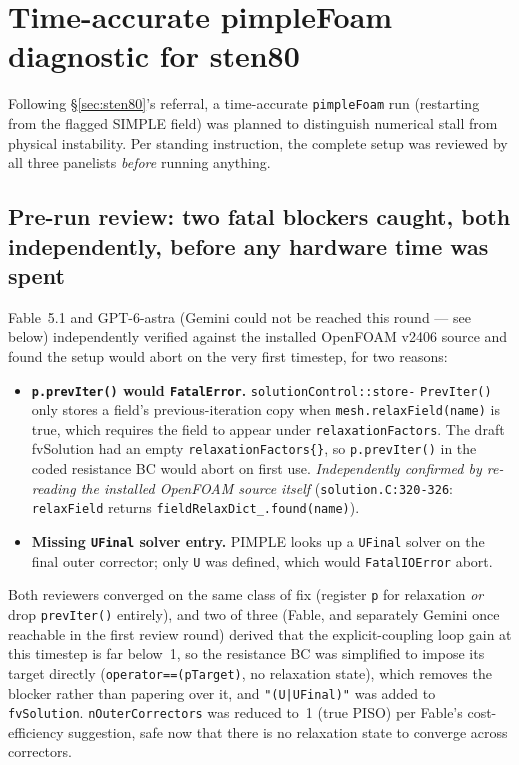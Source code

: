 \documentclass[11pt]{article}
\begin{document}
\section{Time-accurate pimpleFoam diagnostic for sten80}
\label{sec:pimple}
Following \S\ref{sec:sten80}'s referral, a time-accurate \texttt{pimpleFoam} run (restarting from the
flagged SIMPLE field) was planned to distinguish numerical stall from physical instability. Per
standing instruction, the complete setup was reviewed by all three panelists \emph{before} running
anything.

\subsection*{Pre-run review: two fatal blockers caught, both independently, before any hardware time
was spent}
Fable~5.1 and GPT-6-astra (Gemini could not be reached this round --- see below) independently
verified against the installed OpenFOAM v2406 source and found the setup would abort on the very
first timestep, for two reasons:
\begin{itemize}
\item \textbf{\texttt{p.prevIter()} would \texttt{FatalError}.} \texttt{solutionControl::store-}
\texttt{PrevIter()} only stores a field's previous-iteration copy when \texttt{mesh.relaxField(name)}
is true, which requires the field to appear under \texttt{relaxationFactors}. The draft fvSolution had
an empty \texttt{relaxationFactors\{\}}, so \texttt{p.prevIter()} in the coded resistance BC would
abort on first use. \emph{Independently confirmed by re-reading the installed OpenFOAM source itself}
(\texttt{solution.C:320-326}: \texttt{relaxField} returns \texttt{fieldRelaxDict\_\allowbreak{}.found(name)}).
\item \textbf{Missing \texttt{UFinal} solver entry.} PIMPLE looks up a \texttt{UFinal} solver on the
final outer corrector; only \texttt{U} was defined, which would \texttt{FatalIOError} abort.
\end{itemize}
Both reviewers converged on the same class of fix (register \texttt{p} for relaxation \emph{or} drop
\texttt{prevIter()} entirely), and two of three (Fable, and separately Gemini once reachable in the
first review round) derived that the explicit-coupling loop gain at this timestep is far below~1, so
the resistance BC was simplified to impose its target directly (\texttt{operator==(pTarget)}, no
relaxation state), which removes the blocker rather than papering over it, and \texttt{"(U|UFinal)"}
was added to \texttt{fvSolution}. \texttt{nOuterCorrectors} was reduced to~1 (true PISO) per Fable's
cost-efficiency suggestion, safe now that there is no relaxation state to converge across correctors.
\end{document}
